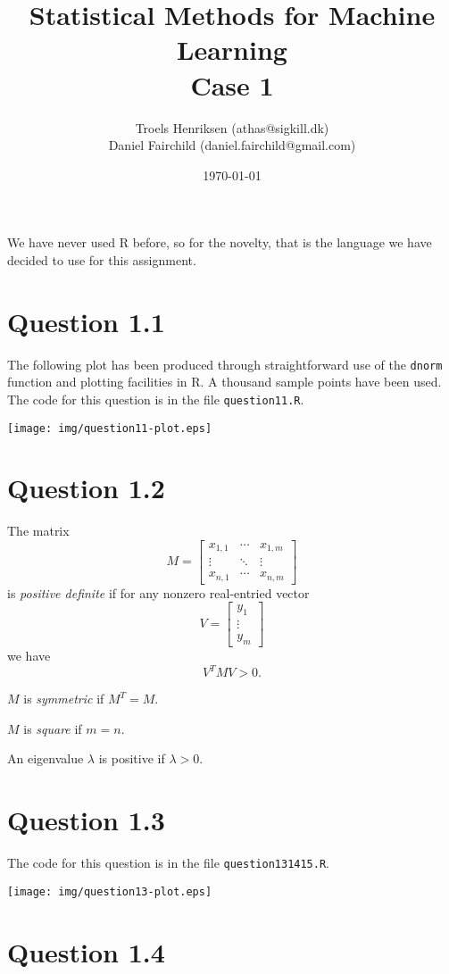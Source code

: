 \documentclass[a4paper, oneside, final]{memoir}
\title{Statistical Methods for Machine Learning\\Case 1}
\author{Troels Henriksen (athas@sigkill.dk) \\ Daniel Fairchild
  (daniel.fairchild@gmail.com)}
\date{\today}
\begin{document}
\maketitle

We have never used R before, so for the novelty, that is the language
we have decided to use for this assignment.

\section*{Question 1.1}

The following plot has been produced through straightforward use of
the \texttt{dnorm} function and plotting facilities in R.  A thousand
sample points have been used.  The code for this question is in the
file \texttt{question11.R}.

\texttt{[image: img/question11-plot.eps]}

\section*{Question 1.2}

The matrix
\[
M=\left[\begin{matrix}
  x_{1,1}&\cdots&x_{1,m}\\\vdots&\ddots&\vdots\\x_{n,1}&\cdots&x_{n,m} \end{matrix}\right]
\]
is \textit{positive definite} if for any nonzero real-entried vector
\[
V=\left[\begin{matrix} y_1 \\ \vdots \\ y_m \end{matrix}\right]
\]
we have
\[
V^TMV > 0.
\]

$M$ is \textit{symmetric} if $M^T=M$.

$M$ is \textit{square} if $m=n$.

An eigenvalue $\lambda$ is positive if $\lambda > 0$.

\section*{Question 1.3}

The code for this question is in the file \texttt{question131415.R}.

\texttt{[image: img/question13-plot.eps]}

\section*{Question 1.4}
\end{document}
